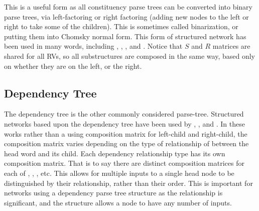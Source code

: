 \documentclass[12pt,parskip]{komatufte}
\begin{document}
This is a useful form as all constituency parse trees can be converted into binary parse trees, via left-factoring or right factoring (adding new nodes to the left or right to take some of the children).
This is sometimes called binarization, or putting them into  Chomsky normal form.
This form of structured network has been used in many words, including , \textcite{SocherEtAl2011:RAE},  \textcite{SocherEtAl2011:PoolRAE},
\textcite{Socher2011ParsingPhrases} and \textcite{zhang2014BRAE}.
Notice that $S$ and $R$ matrices are shared for all RVs, so all substructures are composed in the same way, based only on whether they are on the left, or the right.


\subsection{Dependency Tree}\label{sec:dependency-tree}
The dependency tree is the other commonly considered parse-tree.
Structured networks based upon the dependency tree have been used by , , and .
In these works rather than a using composition matrix for left-child and right-child,
the composition matrix varies depending on the type of relationship of between the head word and its child.
Each dependency relationship type has its own composition matrix.
That is to say there are distinct composition matrices for each of
, , ,  etc.
This allows for multiple inputs to a single head node to be distinguished by their relationship, rather than their order.
This is important for networks using a dependency parse tree structure as the relationship is significant, and the structure allows a node to have any number of inputs.



\end{document}
